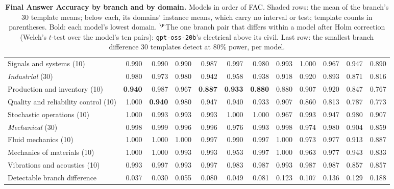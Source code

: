\begin{table}[t]
{\begin{tabular}{l r r r r r r r r r r r }
\quad Signals and systems (10) & 0.990 & 0.990 & 0.990 & 0.987 & 0.997 & 0.980 & 0.993 & 1.000 & 0.967 & 0.947 & 0.890 \\
\rowcolor{gray!10}\textit{Industrial} (30) & 0.980 & 0.973 & 0.980 & 0.942 & 0.958 & 0.938 & 0.918 & 0.920 & 0.893 & 0.871 & 0.816 \\
\quad Production and inventory (10) & \textbf{0.940} & 0.987 & 0.967 & \textbf{0.887} & \textbf{0.933} & \textbf{0.880} & 0.880 & 0.907 & 0.920 & 0.847 & 0.767 \\
\quad Quality and reliability control (10) & 1.000 & \textbf{0.940} & 0.980 & 0.947 & 0.940 & 0.933 & 0.907 & 0.860 & 0.813 & 0.787 & 0.773 \\
\quad Stochastic operations (10) & 1.000 & 0.993 & 0.993 & 0.993 & 1.000 & 1.000 & 0.967 & 0.993 & 0.947 & 0.980 & 0.907 \\
\rowcolor{gray!10}\textit{Mechanical} (30) & 0.998 & 0.999 & 0.996 & 0.996 & 0.976 & 0.993 & 0.998 & 0.974 & 0.980 & 0.904 & 0.859 \\
\quad Fluid mechanics (10) & 1.000 & 1.000 & 1.000 & 0.997 & 0.990 & 0.997 & 1.000 & 0.973 & 0.977 & 0.913 & 0.887 \\
\quad Mechanics of materials (10) & 1.000 & 1.000 & 0.993 & 0.993 & 0.953 & 0.997 & 1.000 & 0.963 & 0.977 & 0.943 & 0.833 \\
\quad Vibrations and acoustics (10) & 0.993 & 0.997 & 0.993 & 0.997 & 0.983 & 0.987 & 0.993 & 0.987 & 0.987 & 0.857 & 0.857 \\
\midrule
Detectable branch difference & 0.037 & 0.030 & 0.055 & 0.080 & 0.049 & 0.081 & 0.123 & 0.107 & 0.136 & 0.129 & 0.188 \\
\bottomrule
\end{tabular}
}
\caption{\textbf{Final Answer Accuracy by branch and by domain.} Models in order of FAC. Shaded
rows: the mean of the branch's 30 template means; below each, its domains' instance means, which
carry no interval or test; template counts in parentheses. Bold: each model's lowest domain.
$^{\P}$The one branch pair that differs within a model after Holm correction (Welch's $t$-test over
the model's ten pairs): \texttt{gpt-oss-20b}'s electrical above its civil. Last row: the smallest
branch difference 30 templates detect at 80\% power, per model.}
\label{tab:branch_domain}
\label{tab:by_branch}
\label{tab:by_domain_kind}
\end{table}
